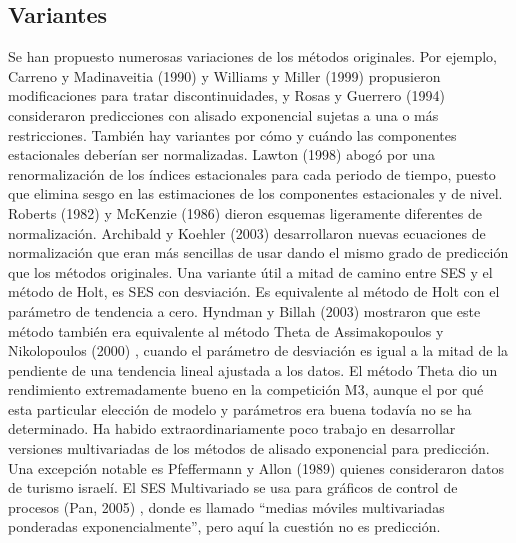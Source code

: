 \documentclass{llncs}
\begin{document}
\subsection{Variantes}
Se han propuesto numerosas variaciones de los métodos originales. Por ejemplo, Carreno y Madinaveitia (1990) \cite{Carreno1990479} y Williams y Miller (1999) \cite{Williams1999273} propusieron modificaciones para tratar discontinuidades, y Rosas y Guerrero (1994) \cite{Rosas1994515} consideraron predicciones con alisado exponencial sujetas a una o más restricciones. También hay variantes por cómo y cuándo las componentes estacionales deberían ser normalizadas. Lawton (1998) \cite{Lawton1998393} abogó por una renormalización de los índices estacionales para cada periodo de tiempo, puesto que elimina sesgo en las estimaciones de los componentes estacionales y de nivel. Roberts (1982) \cite{Roberts1982808} y McKenzie (1986) \cite{Mckenzie1986373} dieron esquemas ligeramente diferentes de normalización. Archibald y Koehler (2003) \cite{Archibald2003143} desarrollaron nuevas ecuaciones de normalización que eran más sencillas de usar dando el mismo grado de predicción que los métodos originales.
Una variante útil a mitad de camino entre SES y el método de Holt, es SES con desviación. Es equivalente al método de Holt con el parámetro de tendencia a cero. Hyndman y Billah (2003) \cite{Hyndman2003287} mostraron que este método también era equivalente al método Theta de Assimakopoulos y Nikolopoulos (2000) \cite{Assimakopoulos2000521}, cuando el parámetro de desviación es igual a la mitad de la pendiente de una tendencia lineal ajustada a los datos. El método Theta dio un rendimiento extremadamente bueno en la competición M3, aunque el por qué esta particular elección de modelo y parámetros era buena todavía no se ha determinado.
Ha habido extraordinariamente poco trabajo en desarrollar versiones multivariadas de los métodos de alisado exponencial para predicción. Una excepción notable es Pfeffermann y Allon (1989) \cite{Pfeffermann198983} quienes consideraron datos de turismo israelí. El SES Multivariado se usa para gráficos de control de procesos (Pan, 2005) \cite{Pan2005695}, donde es llamado “medias móviles multivariadas ponderadas exponencialmente”, pero aquí la cuestión no es predicción.
\end{document}
